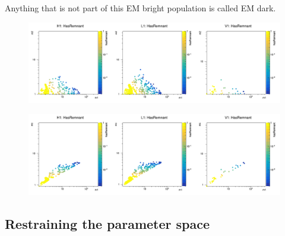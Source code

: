 Anything that is not part of this EM bright population is called EM dark.
%
\begin{figure}[hb]
  \includegraphics[width=\textwidth]{sectionSelection/plotsOther/embright_m1m2.png}
  \label{fig:m1_m2_hasRemnant}
\end{figure}
%
\begin{figure}[hb]
  \includegraphics[width=\textwidth]{sectionSelection/plotsOther/embright_m1mc.png}
  \label{fig:m1_mc_hasRemnant}
\end{figure}



\clearpage\newpage
\subsection{Restraining the parameter space}
\label{sec:selec_param_space}



